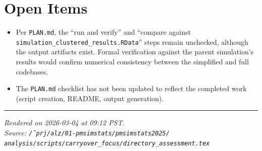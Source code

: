 \documentclass[11pt]{article}
\begin{document}
\section{Open Items}

\begin{itemize}
  \item Per \texttt{PLAN.md}, the ``run and verify'' and ``compare
    against \texttt{simulation\_clustered\_results.RData}'' steps
    remain unchecked, although the output artifacts exist. Formal
    verification against the parent simulation's results would confirm
    numerical consistency between the simplified and full codebases.

  \item The \texttt{PLAN.md} checklist has not been updated to reflect
    the completed work (script creation, README, output generation).
\end{itemize}

\bigskip
\hrule
\medskip
{\small\itshape
  Rendered on 2026-03-04 at 09:12 PST.\\
  Source: \texttt{\~/prj/alz/01-pmsimstats/pmsimstats2025/%
    analysis/scripts/carryover\_focus/directory\_assessment.tex}
}
\end{document}

